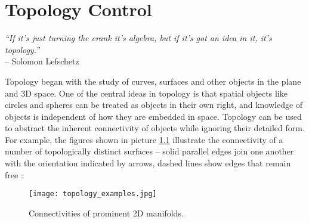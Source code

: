 \chapter{Topology Control}
\label{math0}

\begin{flushright}
\textit{``If it's just turning the crank it's algebra, but if it's got an idea in it, it's topology.''}\\
-- Solomon Lefschetz
\end{flushright}

Topology began with the study of curves, surfaces and other objects in the plane and 3D space.
One of the central ideas in topology is that spatial objects like circles and spheres can be treated as objects in their own right, and knowledge of objects is independent of how they are embedded in space.
Topology can be used to abstract the inherent connectivity of objects while ignoring their detailed form.\\
For example, the figures shown in picture \ref{fig:topology_examples} illustrate the connectivity of a number of topologically distinct surfaces -- solid parallel edges join one another with the orientation indicated by arrows, dashed lines show edges that remain free \citep[][cf. p.1]{Weisstein2012}:
\begin{figure}[ht]
\centering
\texttt{[image: topology\_examples.jpg]}
\caption{Connectivities of prominent 2D manifolds.}
\label{fig:topology_examples}
\end{figure}

